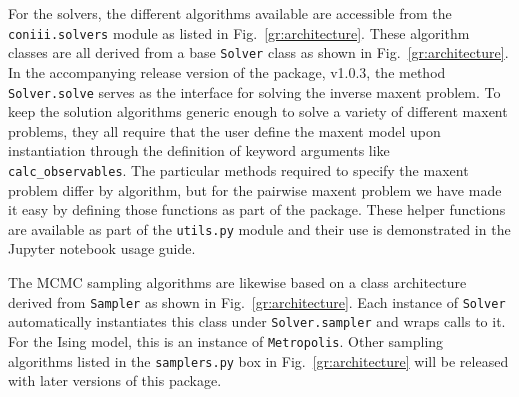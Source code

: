 \documentclass{jors}
\begin{document}
For the solvers, the different algorithms available are accessible from the {\tt coniii.solvers} module as listed in Fig.~\ref{gr:architecture}. These algorithm classes are all derived from a base {\tt Solver} class as shown in Fig.~\ref{gr:architecture}. In the accompanying release version of the package, v1.0.3, the method {\tt Solver.solve} serves as the interface for solving the inverse maxent problem. To keep the solution algorithms generic enough to solve a variety of different maxent problems, they all require that the user define the maxent model upon instantiation through the definition of keyword arguments like {\tt calc\_observables}. The particular methods required to specify the maxent problem differ by algorithm, but for the pairwise maxent problem we have made it easy by defining those functions as part of the package. These helper functions are available as part of the {\tt utils.py} module and their use is demonstrated in the Jupyter notebook usage guide.

The MCMC sampling algorithms are likewise based on a class architecture derived from {\tt Sampler} as shown in Fig.~\ref{gr:architecture}. Each instance of {\tt Solver} automatically instantiates this class under {\tt Solver.sampler} and wraps calls to it. For the Ising model, this is an instance of {\tt Metropolis}. Other sampling algorithms listed in the {\tt samplers.py} box in Fig.~\ref{gr:architecture} will be released with later versions of this package.
\end{document}

